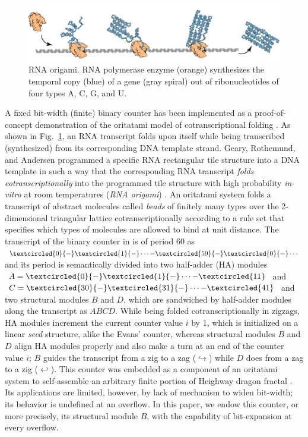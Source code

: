 \documentclass[twocolumn]{svjour3}
\begin{document}
\begin{figure}[tb]
\centering
\includegraphics[width=\linewidth]{fig/rna_origami.pdf}
\caption{RNA origami. RNA polymerase enzyme (orange) synthesizes the temporal copy (blue) of a gene (gray spiral) out of ribonucleotides of four types A, C, G, and U.}
\label{fig:rna_origami}
\end{figure}

A fixed bit-width (finite) binary counter has been implemented as a proof-of-concept demonstration of the oritatami model of cotranscriptional folding \cite{GeMeScSe2019}. 
As shown in Fig.~\ref{fig:rna_origami}, an RNA transcript folds upon itself while being transcribed (synthesized) from its corresponding DNA template strand. 
Geary, Rothemund, and Andersen programmed a specific RNA rectangular tile structure into a DNA template in such a way that the corresponding RNA transcript \textit{folds cotranscriptionally} into the programmed tile structure with high probability \textit{in-vitro} at room temperatures (\textit{RNA origami}) \cite{GearyRothemundAndersen2014}. 
An oritatami system folds a transcript of abstract molecules called \textit{beads} of finitely many types over the 2-dimensional triangular lattice cotranscriptionally according to a rule set that specifies which types of molecules are allowed to bind at  unit distance. 
The transcript of the binary counter in \cite{GeMeScSe2019} is of period 60 as 
$\textcircled{\scriptsize 0}{-}\textcircled{\scriptsize 1}{-} \cdots {-}\textcircled{\scriptsize 59}{-}\textcircled{\scriptsize 0}{-}\cdots$ and its period is semantically divided into two half-adder (HA) modules $A = \textcircled{\scriptsize 0}{-}\textcircled{\scriptsize 1}{-} \cdots {-}\textcircled{\scriptsize 11}$ and $C = \textcircled{\scriptsize 30}{-}\textcircled{\scriptsize 31}{-} \cdots {-}\textcircled{\scriptsize 41}$ and two structural modules $B$ and $D$, which are sandwiched by half-adder modules along the transcript as $ABCD$.
While being folded cotranscriptionally in zigzags, HA modules increment the current counter value $i$ by 1, which is initialized on a linear \textit{seed} structure, alike the Evans' counter, whereas structural modules $B$ and $D$ align HA modules properly and also make a turn at an end of the counter value $i$; $B$ guides the transcript from a zig to a zag ($\hookrightarrow$) while $D$ does from a zag to a zig ($\hookleftarrow$). 
This counter was embedded as a component of an oritatami system to self-assemble an arbitrary finite portion of Heighway dragon fractal \cite{MasudaSekiUbukata2018}. 
Its applications are limited, however, by lack of mechanism to widen bit-width; its behavior is undefined at an overflow. 
In this paper, we endow this counter, or more precisely, its structural module $B$, with the capability of bit-expansion at every overflow. 
\end{document}
